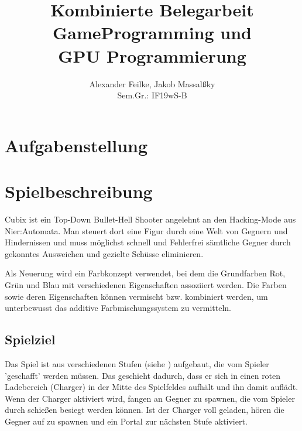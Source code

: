 \documentclass[a4paper,10pt,ngerman,fontsize=12pt]{scrreprt}
\title{Kombinierte Belegarbeit \\ GameProgramming und \\ GPU Programmierung}
\author{Alexander Feilke, Jakob Massal{\ss}ky \\ Sem.Gr.: IF19wS-B}
\begin{document}
\normalfont

\maketitle
\newpage %

\renewcommand{\contentsname}{Inhaltsverzeichnis}
\tableofcontents
\newpage


\sloppy
\flushbottom



\chapter{Aufgabenstellung}
\lipsum[3]





\chapter{Spielbeschreibung}

Cubix ist ein Top-Down Bullet-Hell Shooter angelehnt an den Hacking-Mode aus Nier:Automata\cite{qNierHM}.
Man steuert dort eine Figur durch eine Welt von Gegnern und Hindernissen und muss möglichst schnell und Fehlerfrei sämtliche Gegner durch gekonntes Ausweichen und gezielte Schüsse eliminieren.

Als Neuerung wird ein Farbkonzept verwendet, bei dem die Grundfarben Rot, Grün und Blau mit verschiedenen Eigenschaften assoziiert werden. Die Farben sowie deren Eigenschaften können vermischt bzw. kombiniert werden, um unterbewusst das additive Farbmischungssystem zu vermitteln.




\section{Spielziel}

Das Spiel ist aus verschiedenen Stufen (siehe ) aufgebaut, die vom Spieler 'geschafft' werden müssen.
Das geschieht dadurch, dass er sich in einen roten Ladebereich (Charger) in der Mitte des Spielfeldes aufhält und ihn damit auflädt.
Wenn der Charger aktiviert wird, fangen an Gegner zu spawnen, die vom Spieler durch schie{\ss}en besiegt werden können.
Ist der Charger voll geladen, hören die Gegner auf zu spawnen und ein Portal zur nächsten Stufe aktiviert.
\end{document}
